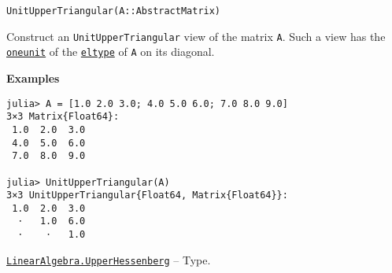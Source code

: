 \begin{adjustwidth}{2em}{0pt}


\begin{verbatim}
UnitUpperTriangular(A::AbstractMatrix)
\end{verbatim}

Construct an \texttt{UnitUpperTriangular} view of the matrix \texttt{A}. Such a view has the \hyperlink{2310843180104103470}{\texttt{oneunit}} of the \hyperlink{6396209842929672718}{\texttt{eltype}} of \texttt{A} on its diagonal.

\textbf{Examples}


\begin{verbatim}
julia> A = [1.0 2.0 3.0; 4.0 5.0 6.0; 7.0 8.0 9.0]
3×3 Matrix{Float64}:
 1.0  2.0  3.0
 4.0  5.0  6.0
 7.0  8.0  9.0

julia> UnitUpperTriangular(A)
3×3 UnitUpperTriangular{Float64, Matrix{Float64}}:
 1.0  2.0  3.0
  ⋅   1.0  6.0
  ⋅    ⋅   1.0
\end{verbatim}



\end{adjustwidth}
\hypertarget{6167777885202579792}{}
\hyperlink{6167777885202579792}{\texttt{LinearAlgebra.UpperHessenberg}}  -- {Type.}

